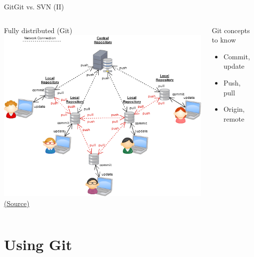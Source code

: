 \documentclass{beamer}
\begin{document}
\begin{frame}{Git}{Git vs. SVN (II)}
\begin{center}
\begin{columns}
	\centering Fully distributed (Git)\\\smallskip
	\includegraphics[width=\linewidth]{figs/fulldistributed.png}
	\tiny \href{http://softwareengineering.stackexchange.com/questions/35074/im-a-subversion-geek-why-should-i-consider-or-not-consider-mercurial-or-git-or}{(Source)}

	\begin{block}{Git concepts to know}
	\begin{itemize}
	\item Commit, update
	\item Push, pull
	\item Origin, remote
	\end{itemize}
	\end{block}
\end{columns}

\end{center}

\end{frame}


\section{Using Git}

\end{document}
